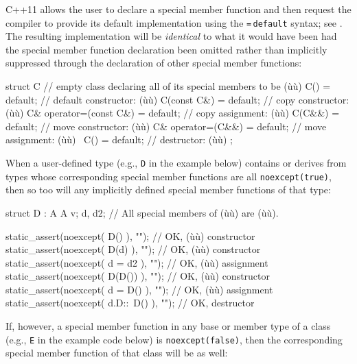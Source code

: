 \noindent C++11 allows the user to declare a special member function and then
request the compiler to provide its default implementation using the
\lstinline!=!\,\lstinline!default! syntax; see . The
resulting implementation will be \emph{identical} to what it would have
been had the special member function declaration been omitted rather
than implicitly suppressed through the declaration of other special
member functions:

\begin{emcppslisting}
struct C  // empty class declaring all of its special members to be (ù{}ù)
{
    C()                    = default;  // default constructor: (ù{}ù)
    C(const C&)            = default;  // copy constructor:    (ù{}ù)
    C& operator=(const C&) = default;  // copy assignment:     (ù{}ù)
    C(C&&)                 = default;  // move constructor:    (ù{}ù)
    C& operator=(C&&)      = default;  // move assignment:     (ù{}ù)
    ~C()                   = default;  // destructor:          (ù{}ù)
};
\end{emcppslisting}
    

\noindent When a user-defined type (e.g., \lstinline!D! in the example below)
contains or derives from types whose corresponding special member
functions are all \lstinline!noexcept(true)!, then so too will any
implicitly defined special member functions of that type:

\begin{emcppslisting}
struct D : A { A v; } d, d2;  // All special members of (ù{}ù) are (ù{}ù).

static_assert(noexcept( D()       ), "");  // OK, (ù{}ù) constructor
static_assert(noexcept( D(d)      ), "");  // OK, (ù{}ù) constructor
static_assert(noexcept( d = d2    ), "");  // OK, (ù{}ù) assignment
static_assert(noexcept( D(D())    ), "");  // OK, (ù{}ù) constructor
static_assert(noexcept( d = D()   ), "");  // OK, (ù{}ù) assignment
static_assert(noexcept( d.D::~D() ), "");  // OK, destructor
\end{emcppslisting}
    

\noindent If, however, a special member function in any base or member type of a
class (e.g., \lstinline!E! in the example code below) is
\lstinline!noexcept(false)!, then the corresponding special member function
of that class will be as well:

